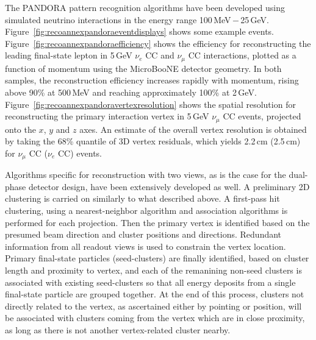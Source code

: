 The PANDORA pattern recognition algorithms have been developed
using simulated neutrino interactions in the energy range 100\,MeV\,$-$\,25\,GeV.
Figure~\ref{fig:recoannexpandoraeventdisplays} shows some example events.
Figure~\ref{fig:recoannexpandoraefficiency} shows the efficiency for reconstructing
the leading final-state lepton in 5\,GeV $\nu_{e}$ CC and $\nu_{\mu}$ CC interactions,
plotted as a function of momentum using the MicroBooNE detector geometry.
In both samples, the reconstruction efficiency increases rapidly with momentum,
rising above 90\% at 500\,MeV and reaching approximately 100\% at 2\,GeV.
Figure~\ref{fig:recoannexpandoravertexresolution} shows the spatial resolution for
reconstructing the primary interaction vertex in 5\,GeV $\nu_{\mu}$ CC events,
projected onto the $x$, $y$ and $z$ axes. An estimate of the overall vertex 
resolution is obtained by taking the 68\% quantile of 3D vertex residuals, 
which yields 2.2\,cm (2.5\,cm) for $\nu_{\mu}$ CC ($\nu_{e}$ CC) events.




Algorithms specific for reconstruction with two views, as is the case for the dual-phase detector design,
have been extensively developed as well. 
A preliminary 2D clustering is carried on similarly to what described above.
A first-pass hit clustering, using a nearest-neighbor algorithm and association algorithms is performed
for each projection. Then the primary vertex is identified based on the presumed beam direction and cluster positions and directions.
Redundant information from all readout views is used to constrain the vertex location.
Primary final-state particles (seed-clusters) are finally identified, based on cluster length and proximity to vertex,
and each of the remanining non-seed clusters is associated with existing seed-clusters so that 
all energy deposits from a single final-state particle are grouped together.
At the end of this process, clusters not directly related to the vertex, as ascertained either by pointing or position,
will be associated with clusters coming from the vertex which are in close proximity, 
as long as there is not another vertex-related cluster nearby. 

